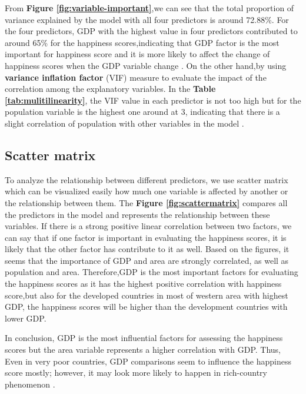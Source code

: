 \documentclass[11pt,a4paper,]{article}
\begin{document}
From \textbf{Figure \ref{fig:variable-important}},we can see that the total proportion of variance explained by the model with all four predictors is around 72.88\%. For the four predictors, GDP with the highest value in four predictors contributed to around 65\% for the happiness scores,indicating that GDP factor is the most important for happiness score and it is more likely to affect the change of happiness scores when the GDP variable change \autocite{gromping2015variable}. On the other hand,by using \textbf{variance inflation factor} (VIF) measure to evaluate the impact of the correlation among the explanatory variables. In the \textbf{Table \ref{tab:mulitilinearity}}, the VIF value in each predictor is not too high but for the population variable is the highest one around at 3, indicating that there is a slight correlation of population with other variables in the model \autocite{daoud2017multicollinearity}.

\hypertarget{scatter-matrix}{%
\subsection{Scatter matrix}\label{scatter-matrix}}

To analyze the relationship between different predictors, we use scatter matrix which can be visualized easily how much one variable is affected by another or the relationship between them. The \textbf{Figure \ref{fig:scattermatrix}} compares all the predictors in the model and represents the relationship between these variables. If there is a strong positive linear correlation between two factors, we can say that if one factor is important in evaluating the happiness scores, it is likely that the other factor has contribute to it as well. Based on the figures, it seems that the importance of GDP and area are strongly correlated, as well as population and area. Therefore,GDP is the most important factors for evaluating the happiness scores as it has the highest positive correlation with happiness score,but also for the developed countries in most of western area with highest GDP, the happiness scores will be higher than the development countries with lower GDP.

In conclusion, GDP is the most influential factors for assessing the happiness scores but the area variable represents a higher correlation with GDP. Thus, Even in very poor countries, GDP comparisons seem to influence the happiness score mostly; however, it may look more likely to happen in rich-country phenomenon \autocite{clark2011will}.
\end{document}
